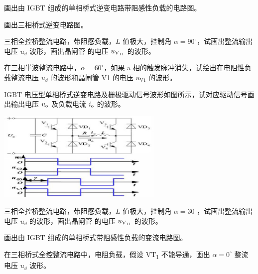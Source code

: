 \documentclass[电力电子]{subfiles}
\begin{document}
\begin{ti}[10 分]
	画出由 IGBT 组成的单相桥式逆变电路带阻感性负载的电路图。
\end{ti}

\begin{ti}[5 分]
	画出三相桥式逆变电路图。
\end{ti}

\begin{ti}[10 分]
	三相全控桥整流电路，带阻感负载，$L$ 值极大，控制角 $\alpha = 90^\circ$，试画出整流输出电压 $u_{\dd}$ 波形，画出晶闸管 \V 的电压 $u_{\text{V\textsubscript{11}}}$ 的波形。
\end{ti}

\begin{ti}[10 分]
	在三相半波整流电路中，$\alpha = 60^\circ$，如果 a 相的触发脉冲消失，试绘出在电阻性负载整流电压 $u_{\dd}$ 的波形和晶闸管 V1 的电压 $u_{\mathrm{V}1}$ 的波形。
\end{ti}

\begin{ti}[10 分]
	IGBT 电压型单相桥式逆变电路及栅极驱动信号波形如图所示，试对应驱动信号画出输出电压 $u_{\mathrm{o}}$ 及负载电流 $i_{\mathrm{o}}$ 的波形。
	\begin{center}
		\includegraphics[width=0.6\textwidth]{figure/fig6}
	\end{center}
\end{ti}

\begin{ti}[10 分]
	三相全控桥整流电路，带阻感负载，$L$ 值极大，控制角 $\alpha = 30^\circ$，试画出整流输出电压 $u_{\dd}$ 的波形，画出晶闸管 \V 的电压 $u_{\text{V\textsubscript{11}}}$ 的波形。
\end{ti}

\begin{ti}[10 分]
	画出由 IGBT 组成的单相桥式带阻感性负载的变流电路图。
\end{ti}

\begin{ti}[5 分]
	在三相桥式全控整流电路中，电阻负载，假设 VT\textsubscript{1} 不能导通，画出 $\alpha = 0^\circ$ 整流电压 $u_{\dd}$ 波形。
\end{ti}
\end{document}
